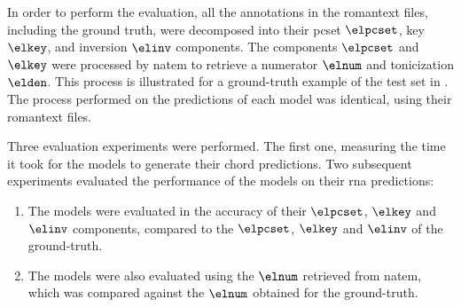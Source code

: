 
In order to perform the evaluation, all the annotations in
the \gls{romantext} files, including the ground truth, were
decomposed into their \gls{pcset} $\elpcset$, key $\elkey$,
and inversion $\elinv$ components. The components $\elpcset$
and $\elkey$ were processed by \gls{natem} to retrieve a
numerator $\elnum$ and tonicization $\elden$. This process
is illustrated for a ground-truth example of the test set in
. The process performed on the
predictions of each model was identical, using their
\gls{romantext} files.


Three evaluation experiments were performed. The first one,
measuring the time it took for the models to generate their
chord predictions. Two subsequent experiments evaluated the
performance of the models on their \gls{rna} predictions:

\begin{enumerate}
    \item The models were evaluated in the accuracy of their
    $\elpcset$, $\elkey$ and $\elinv$ components, compared
    to the $\elpcset$, $\elkey$ and $\elinv$ of the
    ground-truth.
    \item The models were also evaluated using the $\elnum$
    retrieved from \gls{natem}, which was compared against
    the $\elnum$ obtained for the ground-truth.
\end{enumerate}




